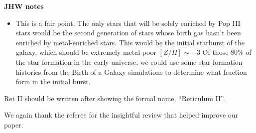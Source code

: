 \documentclass[11pt]{article}
\begin{document}
\noindent\textbf{JHW notes}
\begin{itemize}
  \item This is a fair point.  The only stars that will be solely enriched by Pop III stars would be the second generation of stars whose birth gas hasn't been enriched by metal-enriched stars.  This would be the initial starburst of the galaxy, which should be extremely metal-poor $[Z/H] \sim -3$  Of those 80\% of the star formation in the early universe, we could use some star formation histories from the Birth of a Galaxy simulations to determine what fraction form in the initial burst.
\end{itemize}

\begin{tcolorbox}[colback={lightgray}] 
Ret II should be written after showing the formal name, “Reticulum II”.
\end{tcolorbox} 

We again thank the referee for the insightful review that helped improve our paper.



\end{document}
